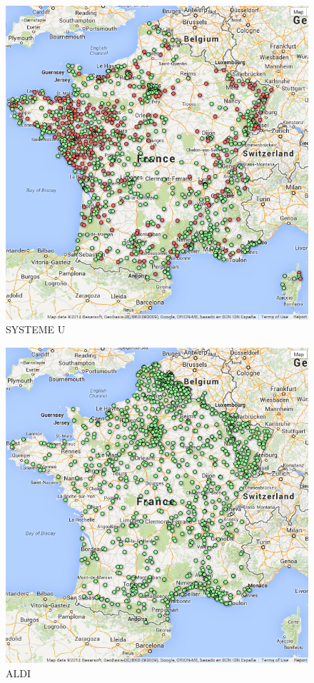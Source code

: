 \documentclass[11pt]{article}
\begin{document}
\begin{figure}[!h]
    \caption{SYSTEME U}
	\centering
		\includegraphics[width=16cm]{images/SYSTEME_U.png}
\end{figure}

\begin{figure}[!h]
    \caption{ALDI}
	\centering
		\includegraphics[width=16cm]{images/ALDI.png}
\end{figure}
\end{document}
